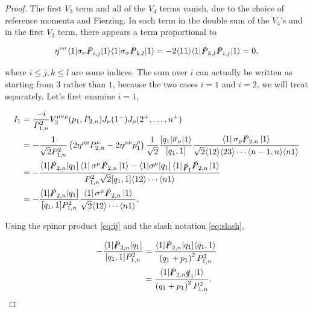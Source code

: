 \documentclass{article}
\theoremstyle{definition}
\numberwithin{equation}{section}
\begin{document}
\begin{proof}
    The first $V_3$ term and all of the $V_4$ terms vanish, due to the choice of reference momenta and Fierzing. In each term in the double sum of the $V_4$'s and in the first $V_3$ term, there appears a term proportional to

    \begin{align*}
        \eta^{\nu \sigma} \langle 1 | \sigma_{\nu} \slashed{P}_{i,j} | 1 \rangle \langle 1 | \sigma_{\sigma} \slashed{P}_{k,l} | 1 \rangle = - 2 \langle 11 \rangle \langle 1 | \slashed{P}_{k,l} \slashed{P}_{i,j} | 1 \rangle = 0,
    \end{align*}

    where $i \leq j,k \leq l$ are some indices. The sum over $i$ can actually be written as starting from $3$ rather than $1$, because the two cases $i=1$ and $i=2$, we will treat separately. Let's first examine $i=1$,

    \begin{align*}
        I_1 &= \frac{-i}{P_{1,n}^2} V_3^{\mu \nu \rho}(p_{1}, P_{2,n}) J_{\nu}(1^{-}) J_{\rho}(2^{+}, \dots , n^{+}) \\
        &= - \frac{1}{\sqrt{2} P_{1,n}^2} \left( 2 \eta^{\rho \mu} P_{2,n}^{\nu} - 2 \eta^{\mu \nu} p_{1}^{\rho} \right) \frac{1}{\sqrt{2}} \frac{ \lbrack q_1 | \overline{\sigma}_{\nu} | 1 \rangle }{ \lbrack q_1,1 \rbrack } \frac{ \bra{1} \sigma_{\rho} \slashed{P}_{2,n} \ket{1} }{ \sqrt{2} \langle 12 \rangle \langle 23 \rangle \cdots \langle n-1,n \rangle \langle n1 \rangle } \\
        &= - \frac{ \langle 1 | \slashed{P}_{2,n} | q_1 \rbrack \bra{1} \sigma^{\mu} \slashed{P}_{2,n} \ket{1} - \langle 1 | \sigma^{\mu} | q_1 \rbrack \bra{1} \slashed{p}_1 \slashed{P}_{2,n} \ket{1} }{ P_{1,n}^2 \sqrt{2} \lbrack q_1,1 \rbrack \langle 12 \rangle \cdots \langle n1 \rangle } \\
        &= - \frac{ \langle 1 | \slashed{P}_{2,n} | q_1 \rbrack }{ \lbrack q_1,1 \rbrack P_{1,n}^2 } \frac{ \bra{1} \sigma^{\mu} \slashed{P}_{2,n} \ket{1} }{ \sqrt{2} \langle 12 \rangle \cdots \langle n1 \rangle }.
    \end{align*}

    Using the spinor product \eqref{eq:ij} and the slash notation \eqref{eq:slash},

    \begin{align*}
        - \frac{ \langle 1 | \slashed{P}_{2,n} | q_1 \rbrack }{ \lbrack q_1,1 \rbrack P_{1,n}^2 } &= \frac{ \langle 1 | \slashed{P}_{2,n} | q_1 \rbrack \langle q_1,1 \rangle }{ \left( q_1 + p_1 \right)^2 P_{1,n}^2 } \\
        &= \frac{ \langle 1 | \slashed{P}_{2,n} \slashed{q}_1 | 1 \rangle }{ \left( q_1 + p_1 \right)^2 P_{1,n}^2 }.
    \end{align*}


\end{proof}
\end{document}
